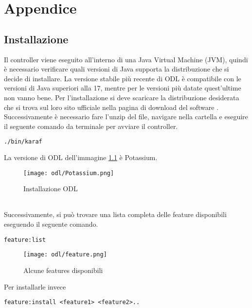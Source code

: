 \chapter{Appendice}

\section {Installazione}
Il controller viene eseguito all'interno di una Java Virtual Machine (JVM), quindi è necessario verificare quali versioni di Java supporta la distribuzione che si decide di installare.
La versione stabile più recente di ODL è compatibile con le versioni di Java superiori alla 17, mentre per le versioni più datate quest'ultime non vanno bene. 
Per l'installazione si deve scaricare la distribuzione desiderata che si trova sul loro sito ufficiale nella pagina di download del software \cite{InstallODL}.
Successivamente è necessario fare l'unzip del file, navigare nella cartella e eseguire il seguente comando da terminale per avviare il controller.
\begin{lstlisting}[language=CLI]
./bin/karaf
\end{lstlisting}
La versione di ODL dell'immagine \ref{fig:installazione} è Potassium.
\begin{figure}[h]
    \centering
   \texttt{[image: odl/Potassium.png]}
    \caption{Installazione ODL}
    \label{fig:installazione}
\end{figure}
\\Successivamente, si può trovare una lista completa delle feature disponibili eseguendo il seguente comando.
\begin{lstlisting}[language=CLI]
feature:list
\end{lstlisting}
\begin{figure}[h]
    \centering
   \texttt{[image: odl/feature.png]}
    \caption{Alcune features disponibili}
    \label{fig:feature}
\end{figure}
Per installarle invece 
\begin{lstlisting}[language=CLI]
feature:install <feature1> <feature2>..
\end{lstlisting}

